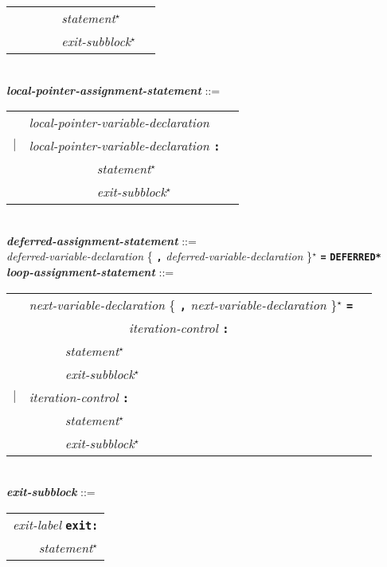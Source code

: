 \documentclass[12pt]{article}
\newcommand{\TT}[1]{{\tt \bfseries #1}}
\newcommand{\STAR}{{\Large $^\star$}}
\newcommand{\ttkey}[1]{{\tt \bfseries #1}}
\newcommand{\emkey}[1]{{\em \bfseries #1}}
\newenvironment{indpar}[1][0.3in]%
	{\begin{list}{}%
		     {\setlength{\itemsep}{0in}%
		      \setlength{\topsep}{0in}%
		      \setlength{\parsep}{1ex}%
		      \setlength{\labelwidth}{#1}%
		      \setlength{\leftmargin}{#1}%
		      \addtolength{\leftmargin}{\labelsep}}%
	 \item}%
	{\end{list}}
\begin{document}
\begin{indpar}
\begin{tabular}[t]{@{}rll}
        & ~~~~~ {\em statement}\STAR{} \\
        & ~~~~~ {\em exit-subblock}\STAR{} \\
    \end{tabular}
\\[0.5ex]
\emkey{local-pointer-assignment-statement} ::= \\
\hspace*{0.5in}
    \begin{tabular}[t]{@{}rll}
        & {\em local-pointer-variable-declaration} \\
    $|$ & {\em local-pointer-variable-declaration} \TT{:} \\
        & ~~~~~~~~~~ {\em statement}\STAR{} \\
        & ~~~~~~~~~~ {\em exit-subblock}\STAR{} \\
    \end{tabular}
\\[0.5ex]
\emkey{deferred-assignment-statement} ::= \\
\hspace*{0.5in}
        {\em deferred-variable-declaration}
	    \{ \TT{,} {\em deferred-variable-declaration} \}\STAR{}
	    \TT{=} \ttkey{*DEFERRED*}
\\[0.5ex]
\emkey{loop-assignment-statement} ::= \\
\hspace*{0.5in}
    \begin{tabular}[t]{@{}rll}
        & {\em next-variable-declaration}
                \{ \TT{,} {\em next-variable-declaration} \}\STAR{}
		\TT{=} \\
	& ~~~~~~~~~~~~~~~ {\em iteration-control} \TT{:} \\
        & ~~~~~ {\em statement}\STAR{} \\
        & ~~~~~ {\em exit-subblock}\STAR{} \\
    $|$ & {\em iteration-control} \TT{:} \\
        & ~~~~~ {\em statement}\STAR{} \\
        & ~~~~~ {\em exit-subblock}\STAR{} \\
    \end{tabular}
\\[0.5ex]
\emkey{exit-subblock} ::=
    \begin{tabular}[t]{l}
    {\em exit-label} \ttkey{exit}\TT{:} \\
    \TT{~~~~}{\em statement}\STAR{} \\
    \end{tabular}

\end{indpar}
\end{document}
